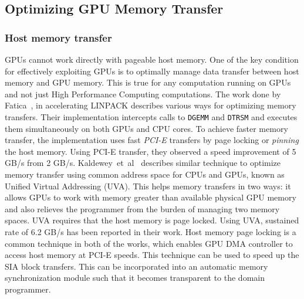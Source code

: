\subsection{Optimizing GPU Memory Transfer}
\subsubsection{Host memory transfer}
GPUs cannot work directly with pageable host memory. One of the key condition for
effectively exploiting GPUs is to optimally manage data transfer between host memory
and GPU memory. This is true for any computation running on GPUs and not just High
Performance Computing computations. The work done by Fatica~\cite{Fatica:2009:ALC:1513895.1513901},
in accelerating LINPACK describes various ways for optimizing memory transfers. Their
implementation intercepts calls to \texttt{DGEMM} and \texttt{DTRSM} and executes them simultaneously
on both GPUs and CPU cores. To achieve faster memory transfer, the implementation uses fast
\textit{PCI-E} transfers by page locking or \textit{pinning} the host memory. Using
PCI-E transfer, they observed a speed improvement of 5 GB/s from 2 GB/s.
Kaldewey~et~al~\cite{Kaldewey:2012:GJP:2236584.2236592} describes similar technique
to optimize memory transfer using common address space for CPUs and GPUs, known as
Unified Virtual Addressing (UVA). This helps memory transfers in two ways: it
allows GPUs to work with memory greater than available physical GPU memory and also relieves
the programmer from the burden of managing two memory spaces. UVA requires that the
host memory is page locked. Using UVA, sustained rate of 6.2 GB/s has been reported in their work.
Host memory page locking is a common technique in both of the works, which enables GPU DMA controller
to access host memory at PCI-E speeds. This technique can be used to speed up the
SIA block transfers. This can be incorporated into an automatic memory synchronization module
such that it becomes transparent to the domain programmer.

